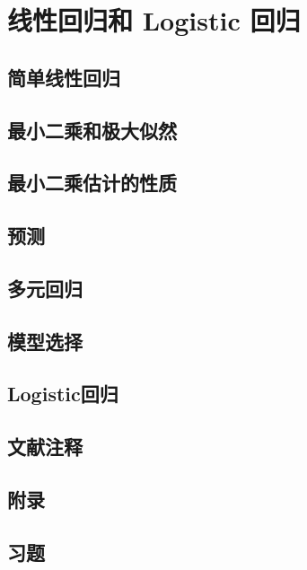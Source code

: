 \chapter{线性回归和 Logistic 回归}

\section{简单线性回归}

\pending

\section{最小二乘和极大似然}

\pending

\section{最小二乘估计的性质}

\pending

\section{预测}

\pending

\section{多元回归}

\pending

\section{模型选择}

\pending

\section{Logistic回归}

\pending

\section{文献注释}

\pending

\section{附录}

\pending

\section{习题}

\pending
